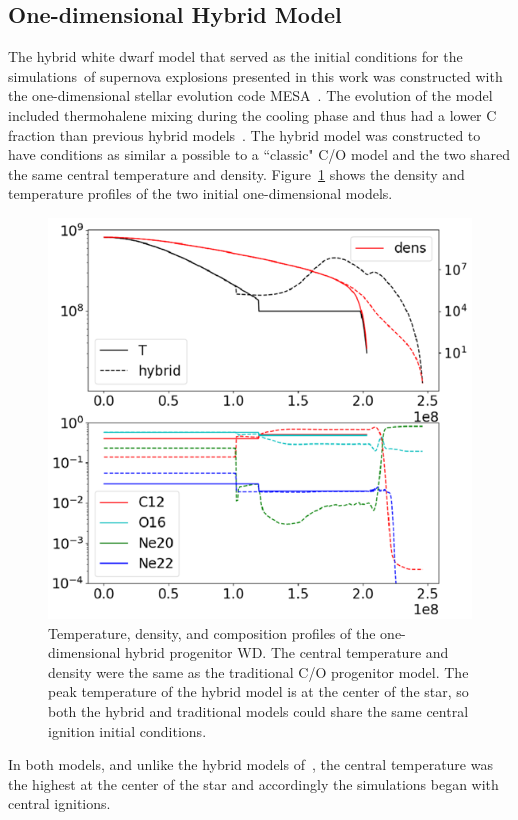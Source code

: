 \documentclass[iop,apj]{emulateapj}
\begin{document}
\subsection{One-dimensional Hybrid Model}

The hybrid white dwarf model that served as the initial conditions 
for the simulations of supernova explosions presented in this work
was constructed with the one-dimensional stellar evolution code 
MESA~\citep{mesa1,mesa2,mesa3,mesa3e}. The evolution of the model 
included thermohalene mixing during the cooling phase and thus
had a lower C fraction than previous hybrid models~\citep{brooksetal2017}.
The hybrid model was constructed to have conditions as similar a possible
to a ``classic" C/O model and the two shared the same central temperature
and density.  Figure~\ref{fig:init_conds} shows the density and temperature
profiles of the two initial one-dimensional models. 
\begin{figure}
\includegraphics[width=\columnwidth]{figures/initial_conds.png}
\caption{\label{fig:init_conds}
Temperature, density, and  composition profiles of the one-dimensional hybrid 
progenitor WD. The central temperature and density were the same as
the traditional C/O progenitor model. 
The peak temperature of the hybrid model is at the center of the star, 
so both the hybrid and traditional models could share the same 
	central ignition initial conditions.
}
\end{figure}
In both models, and unlike the hybrid models of~\citet{willcoxetal2016}, the central
temperature was the highest at the center of the star and accordingly the simulations 
began with central ignitions. 
\end{document}
